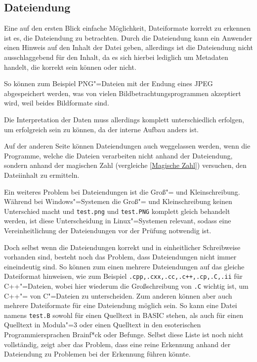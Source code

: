         \subsection{Dateiendung}\label{Dateiendung}
            Eine auf den ersten Blick einfache Möglichkeit,
            Dateiformate korrekt zu erkennen ist es,
            die Dateiendung zu betrachten.
            Durch die Dateiendung kann ein Anwender einen Hinweis auf den Inhalt der Datei geben,
            allerdings ist die Dateiendung nicht ausschlaggebend für den Inhalt,
            da es sich hierbei lediglich um Metadaten handelt,
            die korrekt sein können oder nicht.

            So können zum Beispiel
            \gls{PNG}"=Dateien mit der Endung eines
            \gls{JPEG} abgespeichert werden,
            was von vielen Bildbetrachtungsprogrammen akzeptiert wird,
            weil beides Bildformate sind.

            Die Interpretation der Daten muss allerdings komplett unterschiedlich erfolgen,
            um erfolgreich sein zu können,
            da der interne Aufbau anders ist.

            Auf der anderen Seite können Dateiendungen auch weggelassen werden,
            wenn die Programme,
            welche die Dateien verarbeiten nicht anhand der Dateiendung,
            sondern anhand der magischen Zahl
            (vergleiche
            \vref{Magische Zahl}) versuchen,
            den Dateiinhalt zu ermitteln.

            Ein weiteres Problem bei Dateiendungen ist die Groß"= und
            Kleinschreibung.
            Während bei Windows"=Systemen die Groß"= und
            Kleinschreibung keinen Unterschied macht und
            \lstinline{test.png} und
            \lstinline{test.PNG} komplett gleich behandelt werden,
            ist diese Unterscheidung in Linux"=Systemen relevant,
            sodass eine Vereinheitlichung der Dateiendungen vor der Prüfung notwendig ist.

            Doch selbst wenn die Dateiendungen korrekt und
            in einheitlicher Schreibweise vorhanden sind,
            besteht noch das Problem,
            dass Dateiendungen nicht immer eineindeutig sind.
            So können zum einen mehrere Dateiendungen auf das gleiche Dateiformat hinweisen,
            wie zum Beispiel
            \lstinline{.cpp,.cxx,.cc,.c++,.cp,.C,.ii} für C++"=Dateien,
            wobei hier wiederum die Großschreibung von
            \lstinline{.C} wichtig ist,
            um C++"= von C"=Dateien zu unterscheiden.\cite{FSF2009}
            Zum anderen können aber auch mehrere Dateiformate für eine Dateiendung möglich sein.
            So kann eine Datei namens
            \lstinline{test.B} sowohl für einen Quelltext in
            \gls{BASIC} stehen,
            als auch für einen Quelltext in Modula"=3 oder
            einen Quelltext in den esoterischen Programmiersprachen Brainf*ck oder
            Befunge.\cite{FILExt2018}
            Selbst diese Liste ist noch nicht vollständig,
            zeigt aber das Problem,
            dass eine reine Erkennung anhand der Dateiendung zu Problemen bei der Erkennung führen könnte.

